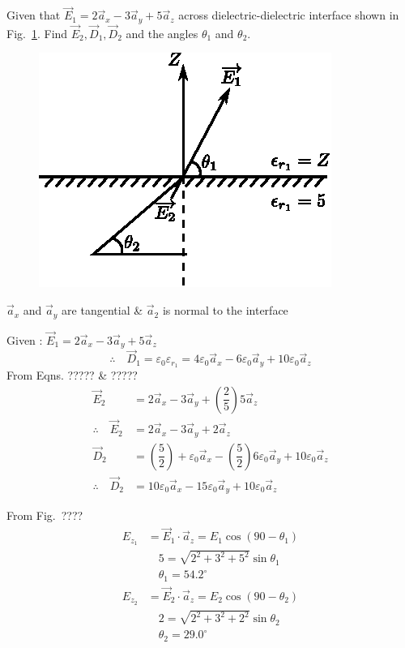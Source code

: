 \begin{problem}
Given that $\vec{E}_{1} = 2\vec{a}_{x} - 3\vec{a}_{y} + 5\vec{a}_{z}$ across dielectric-dielectric interface shown in Fig.~\ref{chap27-fig3}. Find $\vec{E}_{2}, \vec{D}_{1}, \vec{D}_{2}$ and the angles $\theta_{1}$ and $\theta_{2}$. 
\begin{figure}[H]
\centering
\includegraphics[scale=1.1]{images/fig3.eps}\label{chap27-fig3}
\end{figure}
\end{problem}

\begin{solution}
$\vec{a}_{x}$ and $\vec{a}_{y}$ are tangential \& $\vec{a}_{2}$ is normal to the interface

Given : $\vec{E}_{1} = 2\vec{a}_{x} - 3\vec{a}_{y} + 5\vec{a}_{z}$
$$
\textstyle\therefore\quad \vec{D}_{1} = \varepsilon_{0}\varepsilon_{r_{1}} = 4\varepsilon_{0}\vec{a}_{x} - 6\varepsilon_{0}\vec{a}_{y} + 10\varepsilon_{0}\vec{a}_{z}
$$
From Eqns. ????? \& ?????
\begin{align*}
\vec{E}_{2} & = 2\vec{a}_{x} - 3\vec{a}_{y} + \left(\dfrac{2}{5}\right) 5\vec{a}_{z}\\
\therefore\quad \vec{E}_{2} & = 2\vec{a}_{x} - 3\vec{a}_{y} + 2\vec{a}_{z}\\
\vec{D}_{2} & = \left(\dfrac{5}{2}\right) + \varepsilon_{0}\vec{a}_{x} - \left(\dfrac{5}{2}\right) 6\varepsilon_{0}\vec{a}_{y} + 10\varepsilon_{0}\vec{a}_{z}\\
\therefore\quad \vec{D}_{2} & = 10\varepsilon_{0}\vec{a}_{x} - 15\varepsilon_{0}\vec{a}_{y} + 10\varepsilon_{0}\vec{a}_{z}
\end{align*}

From Fig.~????
\begin{align*}
E_{z_{1}} & = \vec{E}_{1} \cdot \vec{a}_{z} = E_{1} \cos (90 - \theta_{1})\\
&\quad 5 = \sqrt{2^{2} + 3^{2} + 5^{2}} \sin \theta_{1}\\
&\quad \theta_{1} = 54.2^{\circ}\\[0.3cm]
E_{z_{2}} & = \vec{E}_{2} \cdot \vec{a}_{z} = E_{2} \cos (90 - \theta_{2})\\
&\quad 2 = \sqrt{2^{2} + 3^{2} + 2^{2}} \sin \theta_{2}\\
&\quad \theta_{2} = 29.0^{\circ}
\end{align*}
\end{solution}

